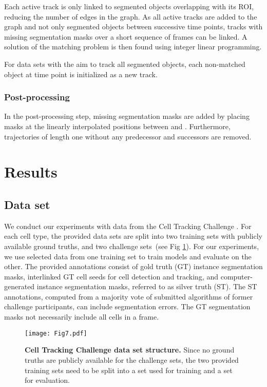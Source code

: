 \documentclass[10pt,letterpaper]{article}
\begin{document}
Each active track is only linked to segmented objects overlapping with its ROI, reducing the number of edges in the graph. As all active tracks are added to the graph and not only segmented objects between successive time points, tracks with missing segmentation masks over a short sequence of frames can be linked. A solution of the matching problem is then found using integer linear programming.

For data sets with the aim to track all segmented objects, each non-matched object at time point  is initialized as a new track.

\subsubsection*{Post-processing}
In the post-processing step, missing segmentation masks are added by placing masks at the linearly interpolated positions between  and . Furthermore, trajectories of length one without any predecessor and successors are removed.

\section*{Results}
\subsection*{Data set}
We conduct our experiments with data from the Cell Tracking Challenge \cite{Ulman2017, Maska2014}. For each cell type, the provided data sets are split into two training sets with publicly available ground truths, and two challenge sets~(see Fig \ref{fig:ctc_data_structure}). For our experiments, we use selected data from one training set to train models and evaluate on the other. The provided annotations consist of gold truth (GT) instance segmentation masks, interlinked GT cell seeds for cell detection and tracking, and computer-generated instance segmentation masks, referred to as silver truth (ST). The ST annotations, computed from a majority vote of submitted algorithms of former challenge participants, can include segmentation errors. The GT segmentation masks not necessarily include all cells in a frame.
\begin{figure}
\centering
\texttt{[image: Fig7.pdf]}
\caption{\textbf{Cell Tracking Challenge data set structure.} Since no ground truths are publicly available for the challenge sets, the two provided training sets need to be split into a set used for training and a set for evaluation.}
\label{fig:ctc_data_structure}
\end{figure}
\end{document}
